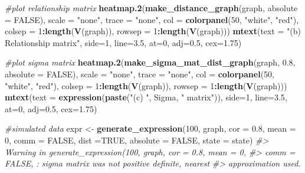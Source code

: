 \documentclass[]{article}
\newenvironment{Shaded}{\begin{snugshade}}{\end{snugshade}}
\newcommand{\CommentTok}[1]{\textcolor[rgb]{0.56,0.35,0.01}{\textit{#1}}}
\newcommand{\DataTypeTok}[1]{\textcolor[rgb]{0.13,0.29,0.53}{#1}}
\newcommand{\DecValTok}[1]{\textcolor[rgb]{0.00,0.00,0.81}{#1}}
\newcommand{\FloatTok}[1]{\textcolor[rgb]{0.00,0.00,0.81}{#1}}
\newcommand{\KeywordTok}[1]{\textcolor[rgb]{0.13,0.29,0.53}{\textbf{#1}}}
\newcommand{\NormalTok}[1]{#1}
\newcommand{\OperatorTok}[1]{\textcolor[rgb]{0.81,0.36,0.00}{\textbf{#1}}}
\newcommand{\OtherTok}[1]{\textcolor[rgb]{0.56,0.35,0.01}{#1}}
\newcommand{\StringTok}[1]{\textcolor[rgb]{0.31,0.60,0.02}{#1}}
\begin{document}
\begin{Shaded}
\begin{Highlighting}[]
\CommentTok{#plot relationship matrix}
\KeywordTok{heatmap.2}\NormalTok{(}\KeywordTok{make_distance_graph}\NormalTok{(graph, }\DataTypeTok{absolute =} \OtherTok{FALSE}\NormalTok{),}
          \DataTypeTok{scale =} \StringTok{"none"}\NormalTok{, }\DataTypeTok{trace =} \StringTok{"none"}\NormalTok{, }\DataTypeTok{col =} \KeywordTok{colorpanel}\NormalTok{(}\DecValTok{50}\NormalTok{, }\StringTok{"white"}\NormalTok{, }\StringTok{"red"}\NormalTok{),}
\DataTypeTok{colsep =} \DecValTok{1}\OperatorTok{:}\KeywordTok{length}\NormalTok{(}\KeywordTok{V}\NormalTok{(graph)), }\DataTypeTok{rowsep =} \DecValTok{1}\OperatorTok{:}\KeywordTok{length}\NormalTok{(}\KeywordTok{V}\NormalTok{(graph)))}
\KeywordTok{mtext}\NormalTok{(}\DataTypeTok{text =} \StringTok{"(b) Relationship matrix"}\NormalTok{, }\DataTypeTok{side=}\DecValTok{1}\NormalTok{, }\DataTypeTok{line=}\FloatTok{3.5}\NormalTok{, }\DataTypeTok{at=}\DecValTok{0}\NormalTok{, }\DataTypeTok{adj=}\FloatTok{0.5}\NormalTok{, }\DataTypeTok{cex=}\FloatTok{1.75}\NormalTok{)}

\CommentTok{#plot sigma matrix}
\KeywordTok{heatmap.2}\NormalTok{(}\KeywordTok{make_sigma_mat_dist_graph}\NormalTok{(graph, }\FloatTok{0.8}\NormalTok{, }\DataTypeTok{absolute =} \OtherTok{FALSE}\NormalTok{),}
\DataTypeTok{scale =} \StringTok{"none"}\NormalTok{, }\DataTypeTok{trace =} \StringTok{"none"}\NormalTok{, }\DataTypeTok{col =} \KeywordTok{colorpanel}\NormalTok{(}\DecValTok{50}\NormalTok{, }\StringTok{"white"}\NormalTok{, }\StringTok{"red"}\NormalTok{),}
\DataTypeTok{colsep =} \DecValTok{1}\OperatorTok{:}\KeywordTok{length}\NormalTok{(}\KeywordTok{V}\NormalTok{(graph)), }\DataTypeTok{rowsep =} \DecValTok{1}\OperatorTok{:}\KeywordTok{length}\NormalTok{(}\KeywordTok{V}\NormalTok{(graph)))}
\KeywordTok{mtext}\NormalTok{(}\DataTypeTok{text =} \KeywordTok{expression}\NormalTok{(}\KeywordTok{paste}\NormalTok{(}\StringTok{"(c) "}\NormalTok{, Sigma, }\StringTok{" matrix"}\NormalTok{)), }\DataTypeTok{side=}\DecValTok{1}\NormalTok{, }\DataTypeTok{line=}\FloatTok{3.5}\NormalTok{, }\DataTypeTok{at=}\DecValTok{0}\NormalTok{, }\DataTypeTok{adj=}\FloatTok{0.5}\NormalTok{, }\DataTypeTok{cex=}\FloatTok{1.75}\NormalTok{)}

\CommentTok{#simulated data}
\NormalTok{expr <-}\StringTok{ }\KeywordTok{generate_expression}\NormalTok{(}\DecValTok{100}\NormalTok{, graph, }\DataTypeTok{cor =} \FloatTok{0.8}\NormalTok{, }\DataTypeTok{mean =} \DecValTok{0}\NormalTok{,}
\DataTypeTok{comm =} \OtherTok{FALSE}\NormalTok{, }\DataTypeTok{dist =}\OtherTok{TRUE}\NormalTok{, }\DataTypeTok{absolute =} \OtherTok{FALSE}\NormalTok{, }\DataTypeTok{state =}\NormalTok{ state)}
\CommentTok{#> Warning in generate_expression(100, graph, cor = 0.8, mean = 0,}
\CommentTok{#> comm = FALSE, : sigma matrix was not positive definite, nearest}
\CommentTok{#> approximation used.}


\end{Highlighting}
\end{Shaded}
\end{document}
